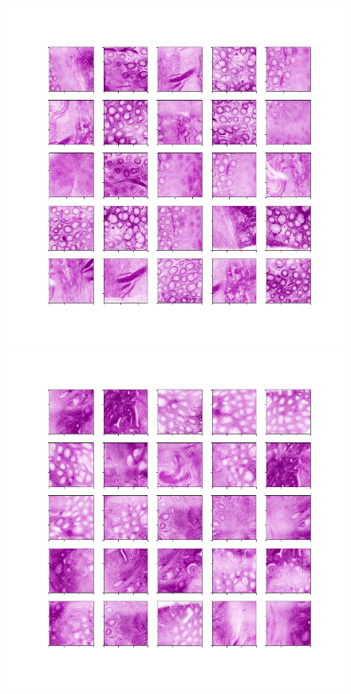 \begin{figure}[H]
	\centering

	\begin{minipage}{0.45\columnwidth}
		\centering
		\includegraphics[clip, width=\linewidth]{fig/preprocessing/cropping/HE/normal/C-013}
	\end{minipage}
	\begin{minipage}{0.45\columnwidth}
		\centering
		\includegraphics[clip, width=\linewidth]{fig/preprocessing/cropping/HE/cancer/C-013}
	\end{minipage}


\end{figure}
